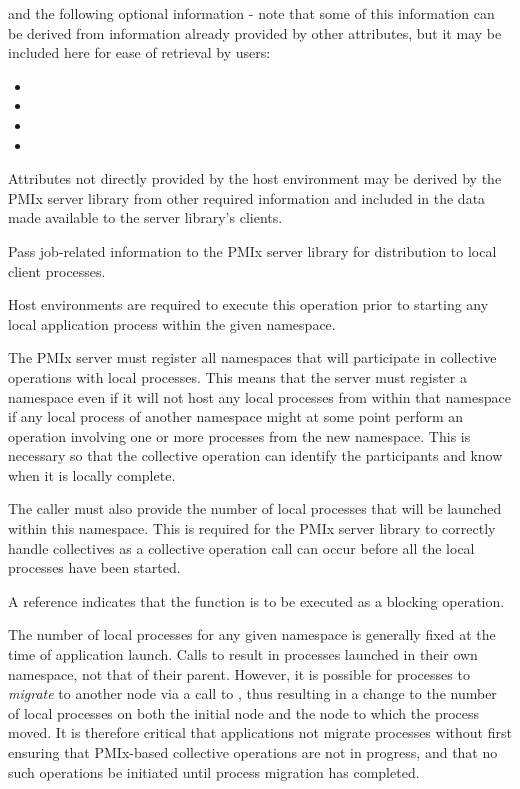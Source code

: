 and the following optional information - note that some of this information can be derived from information already provided by other attributes, but it may be included here for ease of retrieval by users:

\begin{itemize}
    \item {}
    \item {}
    \item {}
    \item {}
\end{itemize}

\divider

Attributes not directly provided by the host environment may be derived by the \ac{PMIx} server library from other required information and included in the data made available to the server library's clients.
\reqattrend


\descr

Pass job-related information to the \ac{PMIx} server library for distribution to local client processes.

\advicermstart
Host environments are required to execute this operation prior to starting any local application process within the given namespace.

The \ac{PMIx} server must register all namespaces that will participate in collective operations with local processes.
This means that the server must register a namespace even if it will not host any local processes from within that namespace if any local process of another namespace might at some point perform an operation involving one or more processes from the new namespace.
This is necessary so that the collective operation can identify the participants and know when it is locally complete.

The caller must also provide the number of local processes that will be launched within this namespace.
This is required for the \ac{PMIx} server library to correctly handle collectives as a collective operation call can occur before all the local processes have been started.

A   reference indicates that the function is to be executed as a blocking operation.
\advicermend

\adviceuserstart
The number of local processes for any given namespace is generally fixed at the time of application launch. Calls to  result in processes launched in their own namespace, not that of their parent. However, it is possible for processes to \textit{migrate} to another node via a call to , thus resulting in a change to the number of local processes on both the initial node and the node to which the process moved. It is therefore critical that applications not migrate processes without first ensuring that \ac{PMIx}-based collective operations are not in progress, and that no such operations be initiated until process migration has completed.
\adviceuserend


